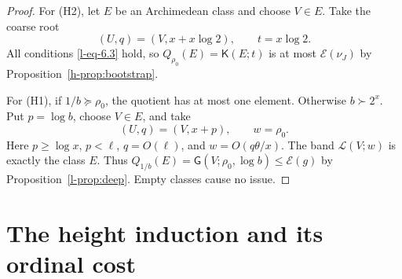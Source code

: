 \documentclass[11pt]{article}
\theoremstyle{definition}
\theoremstyle{remark}
\newcommand{\EE}{\mathcal E}
\newcommand{\KK}{\mathsf K}
\newcommand{\GG}{\mathsf G}
\newcommand{\calL}{\mathcal L}
\numberwithin{equation}{section}
\begin{document}
\begin{proof}
For (H2), let $E$ be an Archimedean class and choose $V\in E$.
Take the coarse root
\[
 (U,q)=(V,x+x\log2),\qquad t=x\log2.
\]
All conditions \eqref{l-eq-6.3} hold, so $Q_{\rho_0}(E)=\KK(E;t)$ is
at most $\EE(\nu_J)$ by Proposition~\ref{h-prop:bootstrap}.

For (H1), if $1/b\succeq\rho_0$, the quotient has at most one
element.  Otherwise $b\succ2^x$.
Put $p=\log b$, choose $V\in E$, and take
\[
 (U,q)=(V,x+p),\qquad w=\rho_0.
\]
Here $p\ge\log x$, $p<\ell$, $q=O(\ell)$, and
$w=O(q\theta/x)$.
The band $\calL(V;w)$ is exactly the class $E$.
Thus
$Q_{1/b}(E)=\GG(V;\rho_0,\log b)\le\EE(g)$
by Proposition~\ref{l-prop:deep}.
Empty classes cause no issue.
\end{proof}



\section{The height induction and its ordinal cost}
\end{document}
